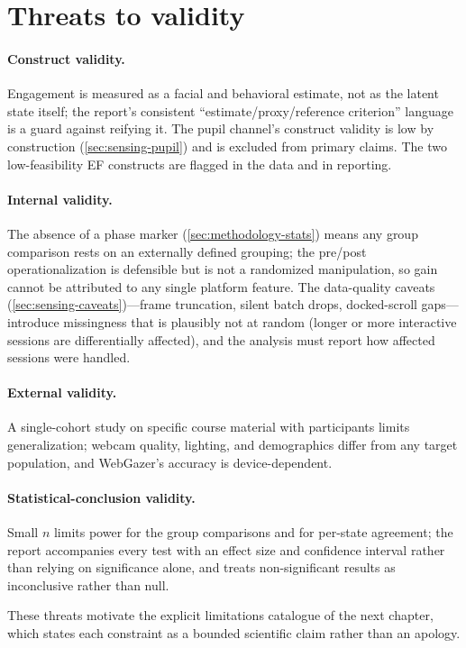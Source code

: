 \section{Threats to validity}
\label{sec:discussion-threats}

\paragraph{Construct validity.} Engagement is measured as a facial and
behavioral estimate, not as the latent state itself; the report's
consistent ``estimate/proxy/reference criterion'' language is a guard
against reifying it. The pupil channel's construct validity is low by
construction (\cref{sec:sensing-pupil}) and is excluded from primary
claims. The two low-feasibility EF constructs are flagged in the data and
in reporting.

\paragraph{Internal validity.} The absence of a phase marker
(\cref{sec:methodology-stats}) means any group comparison rests on an
externally defined grouping; the pre/post operationalization is defensible
but is not a randomized manipulation, so gain cannot be attributed to any
single platform feature. The data-quality caveats
(\cref{sec:sensing-caveats})---frame truncation, silent batch drops,
docked-scroll gaps---introduce missingness that is plausibly not at random
(longer or more interactive sessions are differentially affected), and the
analysis must report how affected sessions were handled.

\paragraph{External validity.} A single-cohort study on specific course
material with  participants limits generalization; webcam quality,
lighting, and demographics differ from any target population, and
WebGazer's accuracy is device-dependent.

\paragraph{Statistical-conclusion validity.} Small $n$ limits power for
the group comparisons and for per-state agreement; the report accompanies
every test with an effect size and confidence interval
\citep{cohen1988} rather than relying on significance alone, and treats
non-significant results as inconclusive rather than null.

\medskip
\noindent These threats motivate the explicit limitations catalogue of the
next chapter, which states each constraint as a bounded scientific claim
rather than an apology.
